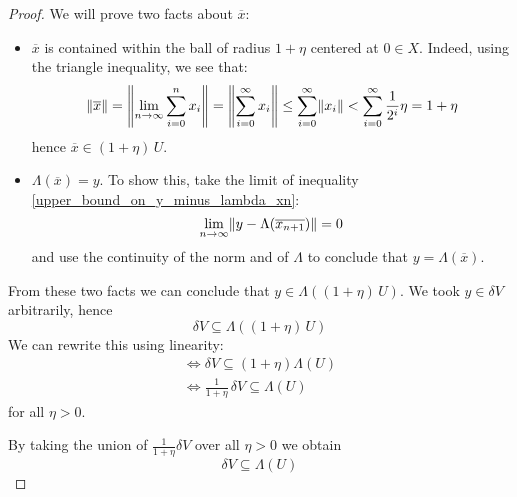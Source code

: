 \documentclass[a4paper, 12pt]{article}
\theoremstyle{definition}
\DeclarePairedDelimiter{\norm}{\lVert}{\rVert}
\begin{document}
\begin{proof}
We will prove two facts about \(\overline{x}\):
\begin{itemize}
    \item \(\overline{x}\) is contained within the ball of radius \(1 + \eta\) centered at \(0 \in X\). Indeed, using the triangle inequality, we see that:
    \[
        \norm{\overline{x}}
        = \norm*{\lim_{n \to \infty} \sum_{i = 0}^{n} x_i}
        = \norm*{\sum_{i=0}^{\infty} x_i}
        \leq \sum_{i=0}^{\infty} \norm*{x_i}
        < \sum_{i=0}^{\infty} \frac{1}{2^i} \eta
        = 1 + \eta
    \]
    hence \(\overline{x} \in (1 + \eta) \, U\).

    \item \(\Lambda(\overline{x}) = y\). To show this, take the limit of inequality \ref{upper_bound_on_y_minus_lambda_xn}:
    \[
        \lim_{n\to\infty} \norm{y - \Lambda(\overline{x_{n+1}})} = 0
    \]
    and use the continuity of the norm and of \(\Lambda\) to conclude that \(y = \Lambda(\overline{x})\).
\end{itemize}

From these two facts we can conclude that \(y \in \Lambda((1 + \eta) \, U)\). We took \(y \in \delta V\) arbitrarily, hence
\[
    \delta V \subseteq \Lambda((1 + \eta) \, U)
\]
We can rewrite this using linearity:
\begin{gather*}
    \iff \delta V \subseteq (1 + \eta) \Lambda(U) \\
    \iff \frac{1}{1 + \eta} \, \delta V \subseteq \Lambda(U)
\end{gather*}
for all \(\eta > 0\).

By taking the union of \(\frac{1}{1 + \eta} \delta V\) over all \(\eta > 0\) we obtain
\[
    \delta V \subseteq \Lambda(U)
\]
\end{proof}
\end{document}
